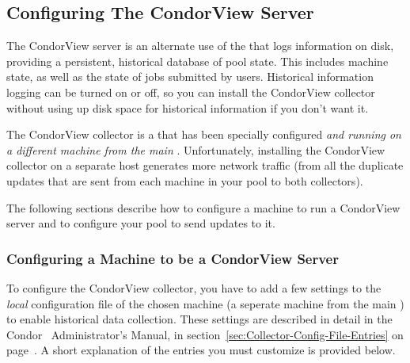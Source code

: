 \subsection{\label{sec:Contrib-CondorView-Install}
Configuring The CondorView Server}

The CondorView server is an alternate use of the
that logs information on disk, providing a 
persistent, historical database of pool state.
This includes machine state, as well as the state of jobs submitted by
users.
Historical information logging can be turned on or off, so you can
install the CondorView collector without using up disk space for
historical information if you don't want it.

The CondorView collector is a  that has been specially 
configured \emph{and running on a different machine from the main
}.
Unfortunately, installing the CondorView collector on a separate host
generates more network traffic (from all the duplicate updates that
are sent from each machine in your pool to both collectors).

The following sections describe how to configure a machine to run a
CondorView server and to configure your pool to send updates to it. 


\subsubsection{\label{sec:CondorView-Server-Setup}
Configuring a Machine to be a CondorView Server} 


To configure the CondorView collector, you have to add a few settings
to the \emph{local} configuration file of the chosen machine (a
seperate machine from the main ) to enable
historical data collection.
These settings are described in detail in the Condor \VersionNotice\ 
Administrator's Manual, in
section~\ref{sec:Collector-Config-File-Entries} on
page~\pageref{sec:Collector-Config-File-Entries}.
A short explanation of the entries you must customize is provided
below.

